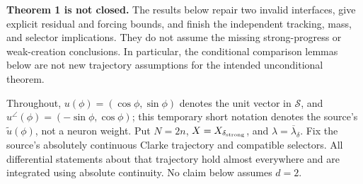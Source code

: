 \documentclass{article} %
\theoremstyle{plain}
\theoremstyle{definition}
\theoremstyle{remark}
\begin{document}
\textbf{Theorem 1 is not closed.} The results below repair two invalid
interfaces, give explicit residual and forcing bounds, and finish the
independent tracking, mass, and selector implications. They do not assume
the missing strong-progress or weak-creation conclusions. In particular,
the conditional comparison lemmas below are not new trajectory assumptions
for the intended unconditional theorem.

Throughout, $u(\phi)=(\cos\phi,\sin\phi)$ denotes the unit vector in
$\mathcal S$, and $u^\angle(\phi)=(-\sin\phi,\cos\phi)$; this temporary
short notation denotes the source's $\widetilde u(\phi)$, not a neuron
weight. Put $N=2n$, $X=X_{\delta_{\rm strong}}$, and
$\lambda=\overline\lambda_\delta$. Fix the source's absolutely continuous
Clarke trajectory and compatible selectors. All differential statements
about that trajectory hold almost everywhere and are integrated using
absolute continuity. No claim below assumes $d=2$.
\end{document}
